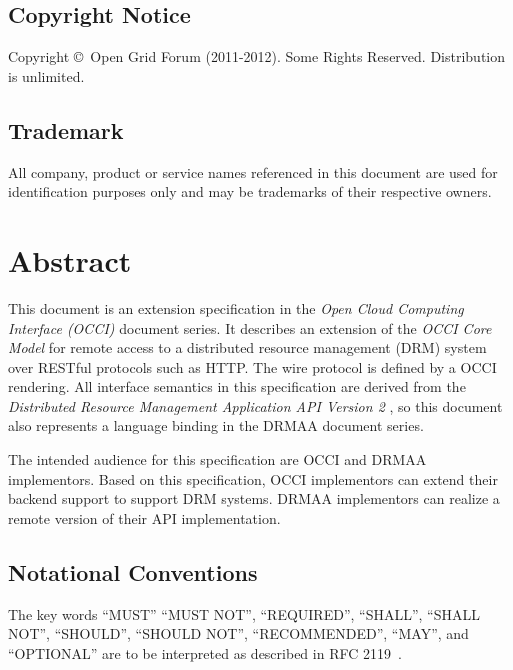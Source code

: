 \documentclass[10pt]{article}
\newcommand{\copyrightyears}{2011-2012}
\begin{document}
\subsection*{Copyright Notice}

Copyright \copyright \ Open Grid Forum (\copyrightyears).  Some Rights Reserved.  
Distribution is unlimited.

\subsection*{Trademark}

All company, product or service names referenced in this document are used for identification purposes only and may be trademarks of their respective owners. 

\section*{Abstract}

This document is an extension specification in the \emph{Open Cloud Computing Interface (OCCI)} document series. It describes an extension of the \emph{OCCI Core Model} \cite{gfd183} for remote access to a distributed resource management (DRM) system over RESTful protocols such as HTTP. The wire protocol is defined by a OCCI rendering. All interface semantics in this specification are derived from the \emph{Distributed Resource Management Application API Version 2} \cite{gfd194}, so this document also represents a language binding in the DRMAA document series.

The intended audience for this specification are OCCI and DRMAA implementors. Based on this specification, OCCI implementors can extend their backend support to support DRM systems. DRMAA implementors can realize a  remote version of their API implementation. 

\newpage

\subsection*{Notational Conventions}
\label{sec:rfc2119}

The key words \enquote{MUST} \enquote{MUST NOT}, \enquote{REQUIRED}, \enquote{SHALL}, \enquote{SHALL NOT}, \enquote{SHOULD}, \enquote{SHOULD NOT}, \enquote{RECOMMENDED}, \enquote{MAY},  and \enquote{OPTIONAL} are to be interpreted as described in RFC 2119~\cite{rfc2119}. 

\newpage
\tableofcontents
\newpage
\end{document}
